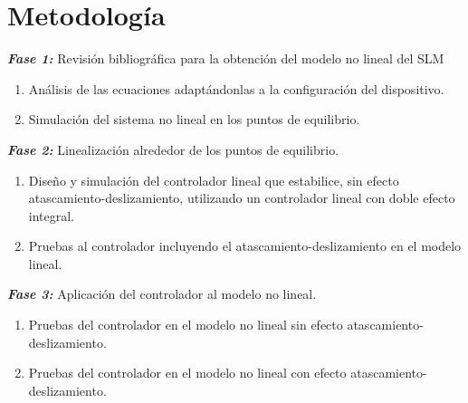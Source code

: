 \chapter{Metodolog\'ia}

\textbf{\textit{Fase 1: }}{Revisión bibliográfica para la obtención del modelo no lineal del SLM}\\
\begin{enumerate}
    \item[a)] Análisis de las ecuaciones adaptándonlas a la configuración del dispositivo.
    \item[b)] Simulación del sistema no lineal en los puntos de equilibrio.
\end{enumerate}

\textbf{\textit{Fase 2: }}{Linealización alrededor de los puntos de equilibrio.}

\begin{enumerate}
    \item[a)] Diseño y simulación del controlador lineal que estabilice, sin efecto atascamiento-deslizamiento, utilizando un controlador lineal con doble efecto integral.
    \item[b)] Pruebas al controlador incluyendo el atascamiento-deslizamiento en el modelo lineal.
\end{enumerate}


\textbf{\textit{Fase 3: }}{Aplicaci\'on del controlador al modelo no lineal.}
\begin{enumerate}
    \item[a)] Pruebas del controlador en el modelo no lineal sin efecto atascamiento-deslizamiento.
    \item[b)] Pruebas del controlador en el modelo no lineal con efecto atascamiento-deslizamiento.    
    
\end{enumerate}
